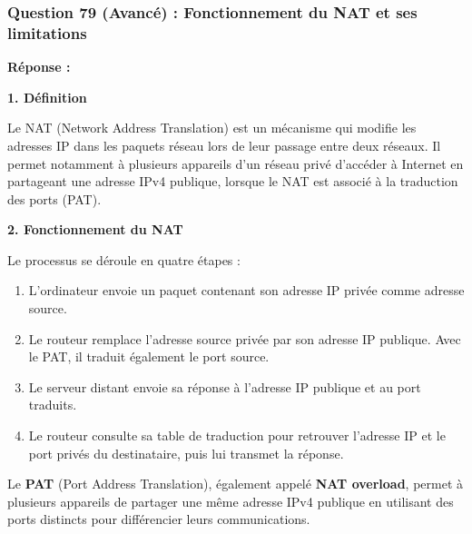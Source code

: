\documentclass[12pt,a4paper]{article}
\newcommand{\reponse}{\textbf{Réponse :}\par}
\begin{document}
\subsubsection*{Question 79 (Avancé) : Fonctionnement du NAT et ses limitations}

\reponse
\textbf{1. Définition}

Le NAT (Network Address Translation) est un mécanisme qui modifie les
adresses IP dans les paquets réseau lors de leur passage entre deux
réseaux. Il permet notamment à plusieurs appareils d'un réseau privé
d'accéder à Internet en partageant une adresse IPv4 publique, lorsque
le NAT est associé à la traduction des ports (PAT).

\textbf{2. Fonctionnement du NAT}

Le processus se déroule en quatre étapes :
\begin{enumerate}
    \item L'ordinateur envoie un paquet contenant son adresse IP privée
    comme adresse source.
    \item Le routeur remplace l'adresse source privée par son adresse
    IP publique. Avec le PAT, il traduit également le port source.
    \item Le serveur distant envoie sa réponse à l'adresse IP publique
    et au port traduits.
    \item Le routeur consulte sa table de traduction pour retrouver
    l'adresse IP et le port privés du destinataire, puis lui transmet
    la réponse.
\end{enumerate}

Le \textbf{PAT} (Port Address Translation), également appelé
\textbf{NAT overload}, permet à plusieurs appareils de partager une
même adresse IPv4 publique en utilisant des ports distincts pour
différencier leurs communications.
\end{document}
